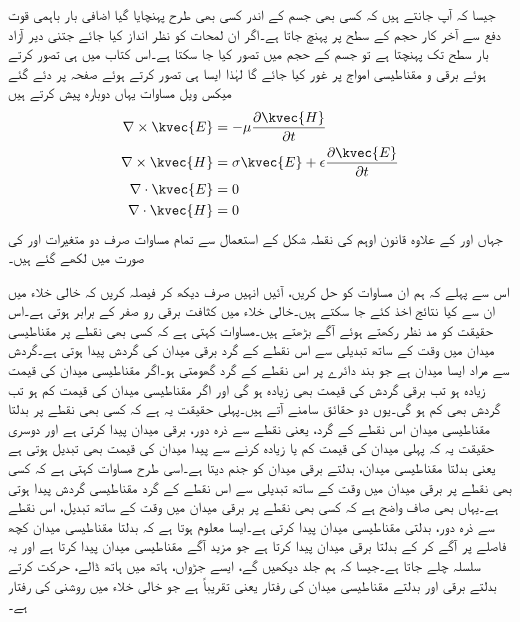 جیسا کہ آپ جانتے ہیں کہ کسی بھی جسم کے اندر کسی بھی طرح پہنچایا گیا اضافی بار باہمی قوت دفع سے آخر کار حجم کے سطح پر پہنچ جاتا ہے۔اگر ان لمحات کو نظر انداز کیا جائے جتنی دیر آزاد بار سطح تک پہنچتا ہے تو جسم کے حجم میں  تصور کیا جا سکتا ہے۔اس کتاب میں  ہی تصور کرتے ہوئے برقی و مقناطیسی امواج پر غور کیا جائے گا لہٰذا ایسا ہی تصور کرتے ہوئے صفحہ  پر دئے گئے میکس ویل مساوات یہاں دوبارہ پیش کرتے ہیں
\begin{align}
\nabla \times \kvec{E}&=-\mu \frac{\partial \kvec{H}}{\partial t}  \label{مساوات_موج_میکس_ویل_خالی_خلاء_الف}\\
\nabla \times \kvec{H}&=\sigma \kvec{E}+\epsilon \frac{\partial \kvec{E}}{\partial t}  \label{مساوات_موج_میکس_ویل_خالی_خلاء_ب}\\
\nabla \cdot \kvec{E}&=0 \label{مساوات_موج_میکس_ویل_خالی_خلاء_پ}\\
\nabla \cdot \kvec{H}&=0  \label{مساوات_موج_میکس_ویل_خالی_خلاء_ت}
\end{align}
جہاں  اور  کے علاوہ قانون اوہم کی نقطہ شکل  کے  استعمال سے تمام مساوات صرف دو متغیرات  اور  کی صورت میں لکھے گئے ہیں۔

اس سے پہلے کہ ہم ان مساوات کو حل کریں، آئیں انہیں صرف دیکھ کر فیصلہ کریں کہ خالی خلاء میں ان سے  کیا نتائج اخذ کئے جا سکتے ہیں۔خالی خلاء میں کثافت برقی رو   صفر کے برابر ہوتی ہے۔اس حقیقت کو مد نظر رکھتے ہوئے آگے بڑھتے ہیں۔مساوات  کہتی ہے کہ کسی بھی نقطے پر مقناطیسی میدان میں وقت کے ساتھ تبدیلی سے اس نقطے کے گرد برقی میدان کی گردش پیدا ہوتی ہے۔گردش سے مراد ایسا میدان ہے جو بند دائرے پر اس نقطے کے گرد گھومتی ہو۔اگر مقناطیسی میدان کی قیمت زیادہ ہو تب برقی گردش کی قیمت بھی زیادہ ہو گی اور اگر مقناطیسی میدان کی قیمت کم ہو تب گردش بھی کم ہو گی۔یوں دو حقائق سامنے آتے ہیں۔پہلی حقیقت یہ ہے کہ کسی بھی نقطے پر بدلتا مقناطیسی میدان اس نقطے کے گرد، یعنی نقطے سے ذرہ دور، برقی میدان پیدا کرتی ہے اور دوسری حقیقت یہ کہ پہلی میدان کی قیمت کم یا زیادہ کرنے سے پیدا میدان کی قیمت بھی تبدیل ہوتی ہے یعنی بدلتا مقناطیسی میدان، بدلتے برقی میدان کو جنم دیتا ہے۔اسی طرح مساوات  کہتی ہے کہ کسی بھی نقطے پر برقی میدان میں وقت کے ساتھ تبدیلی سے اس نقطے کے گرد مقناطیسی گردش پیدا ہوتی ہے۔یہاں بھی صاف واضح ہے کہ کسی بھی نقطے پر برقی میدان میں وقت کے ساتھ تبدیل، اس نقطے سے ذرہ دور، بدلتی مقناطیسی میدان پیدا کرتی ہے۔ایسا معلوم ہوتا ہے کہ بدلتا مقناطیسی میدان کچھ فاصلے پر آگے کر کے بدلتا برقی میدان پیدا کرتا ہے جو مزید آگے مقناطیسی میدان پیدا کرتا ہے اور یہ سلسلہ چلے جاتا ہے۔جیسا کہ ہم جلد دیکھیں گے، ایسے جڑواں، ہاتھ میں ہاتھ ڈالے، حرکت کرتے بدلتے برقی اور بدلتے مقناطیسی میدان کی رفتار  یعنی تقریباً  ہے جو خالی خلاء میں روشنی کی رفتار ہے۔

